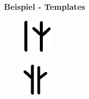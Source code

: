 \documentclass[12pt]{beamer}
\begin{document}
    \begin{frame}
        \frametitle{Beispiel - Templates}
        \begin{figure}
            \centering
            \includegraphics[width=0.3cm]{../images/Template_4.PNG}
            \includegraphics[width=1.1cm]{../images/Template_1.PNG}
            \\~\\
            \includegraphics[width=0.6cm]{../images/Template_2.PNG}
            \includegraphics[width=0.6cm]{../images/Template_3.PNG}
        \end{figure}
    \end{frame}
\end{document}
